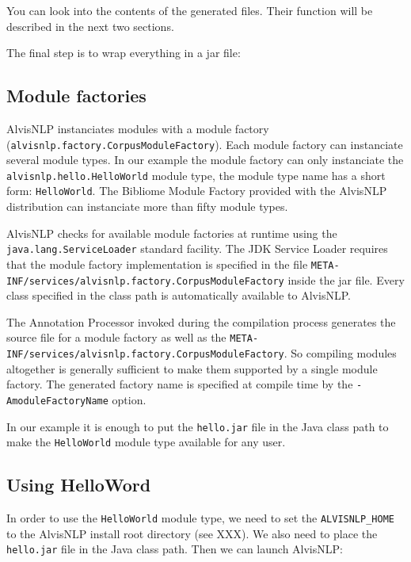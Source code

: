 \documentclass[a4paper]{article}
\begin{document}
You can look into the contents of the generated files.
Their function will be described in the next two sections.

The final step is to wrap everything in a jar file:


\subsection{Module factories}
\label{ModuleFactories}

AlvisNLP instanciates modules with a module factory (\texttt{alvisnlp.factory.CorpusModuleFactory}).
Each module factory can instanciate several module types.
In our example the module factory can only instanciate the \texttt{alvisnlp.hello.HelloWorld} module type, the module type name has a short form: \texttt{HelloWorld}.
The Bibliome Module Factory provided with the AlvisNLP distribution can instanciate more than fifty module types.

AlvisNLP checks for available module factories at runtime using the \texttt{java.lang.ServiceLoader} standard facility.
The JDK Service Loader requires that the module factory implementation is specified in the file \texttt{META-INF/services/alvisnlp.factory.CorpusModuleFactory} inside the jar file.
Every class specified in the class path is automatically available to AlvisNLP.

The Annotation Processor invoked during the compilation process generates the source file for a module factory as well as the \texttt{META-INF/services/alvisnlp.factory.CorpusModuleFactory}.
So compiling modules altogether is generally sufficient to make them supported by a single module factory.
The generated factory name is specified at compile time by the \texttt{-AmoduleFactoryName} option.

In our example it is enough to put the \texttt{hello.jar} file in the Java class path to make the \texttt{HelloWorld} module type available for any user.

\subsection{Using HelloWord}
In order to use the \texttt{HelloWorld} module type, we need to set the \texttt{ALVISNLP\_HOME} to the AlvisNLP install root directory (see XXX).
We also need to place the \texttt{hello.jar} file in the Java class path.
Then we can launch AlvisNLP:

\end{document}
